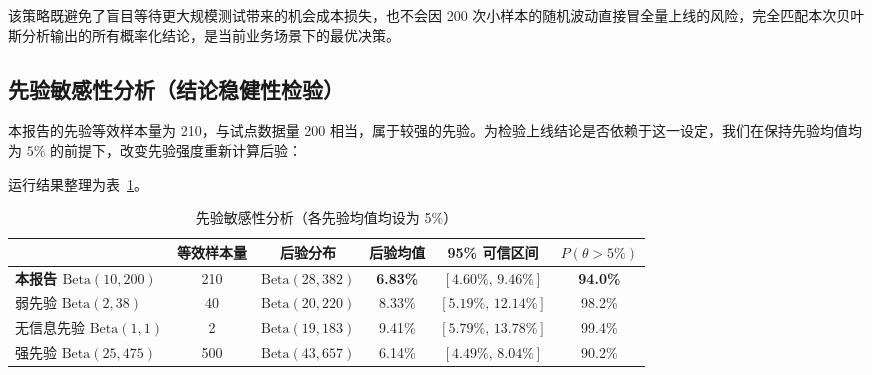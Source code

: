 \documentclass[12pt,a4paper,UTF8,fontset=none]{ctexart}
\newcommand{\thead}[1]{\sffamily\bfseries\color{navy}#1}
\newcommand{\tht}{\theta}
\begin{document}
该策略既避免了盲目等待更大规模测试带来的机会成本损失，也不会因 200 次小样本的随机波动直接冒全量上线的风险，完全匹配本次贝叶斯分析输出的所有概率化结论，是当前业务场景下的最优决策。

\subsection{先验敏感性分析（结论稳健性检验）}

本报告的先验等效样本量为 210，与试点数据量 200 相当，属于较强的先验。为检验上线结论是否依赖于这一设定，我们在保持先验均值均为 $5\%$ 的前提下，改变先验强度重新计算后验：


运行结果整理为表~\ref{tab:sens}。

\begin{table}[H]
\centering
\caption{先验敏感性分析（各先验均值均设为 5\%）}
\label{tab:sens}
\small
\setlength{\tabcolsep}{4pt}
\begin{tabular}{>{\raggedright\arraybackslash}p{3.0cm} c c c c c}
\toprule
\multicolumn{1}{l}{\thead{先验设定}} & \thead{等效样本量} & \thead{后验分布} & \thead{后验均值} & \thead{95\% 可信区间} & \thead{$P(\tht>5\%)$} \\
\midrule
\textbf{本报告 $\mathrm{Beta}(10,200)$} & 210 & $\mathrm{Beta}(28,382)$ & \textbf{6.83\%} & $[4.60\%,\,9.46\%]$  & \textbf{94.0\%} \\
\rowcolor{softbg} 弱先验 $\mathrm{Beta}(2,38)$ & 40 & $\mathrm{Beta}(20,220)$ & 8.33\% & $[5.19\%,\,12.14\%]$ & 98.2\% \\
无信息先验 $\mathrm{Beta}(1,1)$ & 2 & $\mathrm{Beta}(19,183)$ & 9.41\% & $[5.79\%,\,13.78\%]$ & 99.4\% \\
\rowcolor{softbg} 强先验 $\mathrm{Beta}(25,475)$ & 500 & $\mathrm{Beta}(43,657)$ & 6.14\% & $[4.49\%,\,8.04\%]$ & 90.2\% \\
\bottomrule
\end{tabular}
\end{table}
\end{document}
